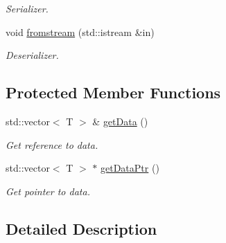 \begin{DoxyCompactItemize}
\begin{DoxyCompactList}\small\item\em Serializer. \item\end{DoxyCompactList}\item 
\hypertarget{classgdf_1_1_channel_data_a5ec0367f1377269cdeba97de05e1280f}{
void \hyperlink{classgdf_1_1_channel_data_a5ec0367f1377269cdeba97de05e1280f}{fromstream} (std::istream \&in)}
\label{classgdf_1_1_channel_data_a5ec0367f1377269cdeba97de05e1280f}

\begin{DoxyCompactList}\small\item\em Deserializer. \item\end{DoxyCompactList}\end{DoxyCompactItemize}
\subsection*{Protected Member Functions}
\begin{DoxyCompactItemize}
\item 
\hypertarget{classgdf_1_1_channel_data_ad17629e054633b2a414bf66e436b4880}{
std::vector$<$ T $>$ \& \hyperlink{classgdf_1_1_channel_data_ad17629e054633b2a414bf66e436b4880}{getData} ()}
\label{classgdf_1_1_channel_data_ad17629e054633b2a414bf66e436b4880}

\begin{DoxyCompactList}\small\item\em Get reference to data. \item\end{DoxyCompactList}\item 
\hypertarget{classgdf_1_1_channel_data_abc52094c23daca566e177d4a6b6e1e23}{
std::vector$<$ T $>$ $\ast$ \hyperlink{classgdf_1_1_channel_data_abc52094c23daca566e177d4a6b6e1e23}{getDataPtr} ()}
\label{classgdf_1_1_channel_data_abc52094c23daca566e177d4a6b6e1e23}

\begin{DoxyCompactList}\small\item\em Get pointer to data. \item\end{DoxyCompactList}\end{DoxyCompactItemize}


\subsection{Detailed Description}

